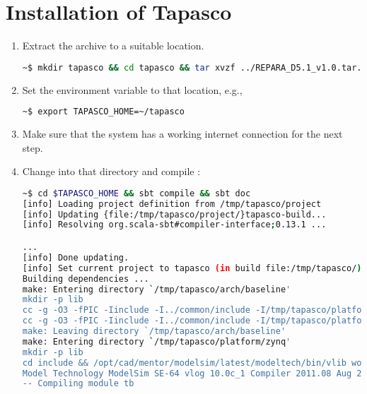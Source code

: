 \section{Installation of Tapasco}%
\begin{enumerate}
  \item Extract the \tapasco{} archive to a suitable location.
%
\begin{lstlisting}[language=bash]
~$ mkdir tapasco && cd tapasco && tar xvzf ../REPARA_D5.1_v1.0.tar.gz
\end{lstlisting}
%
  \item Set the  environment variable to that location, e.g.,
%
\begin{lstlisting}[language=bash]
~$ export TAPASCO_HOME=~/tapasco
\end{lstlisting}
%
  \item Make sure that the system has a working internet connection for the next step.
  \item Change into that directory and compile \tapasco{}:
        \begin{lstlisting}[language=bash]
~$ cd $TAPASCO_HOME && sbt compile && sbt doc
[info] Loading project definition from /tmp/tapasco/project
[info] Updating {file:/tmp/tapasco/project/}tapasco-build...
[info] Resolving org.scala-sbt#compiler-interface;0.13.1 ...

...
[info] Done updating.
[info] Set current project to tapasco (in build file:/tmp/tapasco/)
Building dependencies ...
make: Entering directory `/tmp/tapasco/arch/baseline'
mkdir -p lib
cc -g -O3 -fPIC -Iinclude -I../common/include -I/tmp/tapasco/platform/common/include -I../common/src -std=gnu99 -pedantic-errors -Wall -Werror  -shared -o lib/libtapasco-baseline-sim.so src/tapasco_sim.c src/tapasco_device.c src/tapasco_address_map.c ../common/src/tapasco_errors.c ../common/src/tapasco_functions.c ../common/src/tapasco_scheduler.c ../common/src/tapasco_jobs.c
cc -g -O3 -fPIC -Iinclude -I../common/include -I/tmp/tapasco/platform/common/include -I../common/src -std=gnu99 -pedantic-errors -Wall -Werror  -shared -o lib/libtapasco-baseline-bit.so src/tapasco_sim.c src/tapasco_device.c src/tapasco_address_map.c ../common/src/tapasco_errors.c ../common/src/tapasco_functions.c ../common/src/tapasco_scheduler.c ../common/src/tapasco_jobs.c
make: Leaving directory `/tmp/tapasco/arch/baseline'
make: Entering directory `/tmp/tapasco/platform/zynq'
mkdir -p lib
cd include && /opt/cad/mentor/modelsim/latest/modeltech/bin/vlib work  && /opt/cad/mentor/modelsim/latest/modeltech/bin/vlog -dpiheader platform_dpi.h -sv ../sv/platform-dpi.sv +incdir+../include && rm -rf work transcript
Model Technology ModelSim SE-64 vlog 10.0c_1 Compiler 2011.08 Aug 26 2011
-- Compiling module tb


\end{lstlisting}
\end{enumerate}
